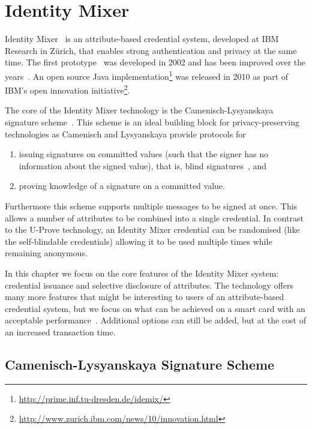 \chapter{Identity Mixer\label{chp:idemix}}

Identity Mixer~\cite{CamenischLysyanskaya2001,IdemixCrypto2012} is an
attribute-based credential system, developed at IBM Research in Z\"urich, that
enables strong authentication and privacy at the same time. The first
prototype~\cite{CamenischH02} was developed in 2002 and has been improved over
the years~\cite{BrickellCC2004,CamenischGroth2004}. An open source Java
implementation\footnote{\url{http://prime.inf.tu-dresden.de/idemix/}} was
released in 2010 as part of IBM's open innovation
initiative\footnote{\url{http://www.zurich.ibm.com/news/10/innovation.html}}.

The core of the Identity Mixer technology is the Camenisch-Lysyanskaya signature
scheme~\cite{CamenischLysyanskaya2003,Lysyanskaya2002}. This scheme is an ideal
building block for privacy-preserving technologies as Camenisch and Lysyanskaya
provide protocols for
\begin{enumerate}
  \item issuing signatures on committed values (such that the signer has no
    information about the signed value), that is, blind
    signatures~\cite{Chaum1983}, and
  \item proving knowledge of a signature on a committed value.
\end{enumerate}
Furthermore this scheme supports multiple messages to be signed at once. This
allows a number of attributes to be combined into a single credential. In
contrast to the U-Prove technology, an Identity Mixer credential can be
randomised (like the self-blindable credentials) allowing it to be used multiple
times while remaining anonymous.

In this chapter we focus on the core features of the Identity Mixer system:
credential issuance and selective disclosure of attributes. The technology
offers many more features that might be interesting to users of an
attribute-based credential system, but we focus on what can be achieved on a
smart card with an acceptable performance~\cite{VullersAlpar2013}. Additional
options can still be added, but at the cost of an increased transaction time.

\section{Camenisch-Lysyanskaya Signature Scheme\label{sec:CL-scheme}}

